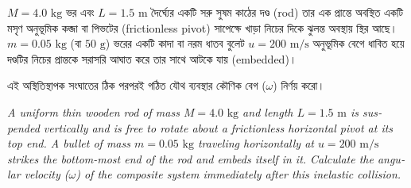 \documentclass[12pt, a4paper]{article}
\begin{document}
\begin{tcolorbox}[questionbox={প্রশ্ন (Question) 19}]
\noindent
$M = 4.0\text{ kg}$ ভর এবং $L = 1.5\text{ m}$ দৈর্ঘ্যের একটি সরু সুষম কাঠের দণ্ড (rod) তার এক প্রান্তে অবস্থিত একটি মসৃণ অনুভূমিক কব্জা বা পিভটের (frictionless pivot) সাপেক্ষে খাড়া নিচের দিকে ঝুলন্ত অবস্থায় স্থির আছে। $m = 0.05\text{ kg}$ (বা $50\text{ g}$) ভরের একটি কাদা বা নরম ধাতব বুলেট $u = 200\text{ m/s}$ অনুভূমিক বেগে ধাবিত হয়ে দণ্ডটির নিচের প্রান্তকে সরাসরি আঘাত করে তার সাথে আটকে যায় (embedded)। 

\vspace{0.3em}
\noindent
এই অস্থিতিস্থাপক সংঘাতের ঠিক পরপরই গঠিত যৌথ ব্যবস্থার কৌণিক বেগ ($\omega$) নির্ণয় করো।

\vspace{0.8em}
\begin{english}
\noindent\textit{\color{darkgray}
A uniform thin wooden rod of mass $M = 4.0\text{ kg}$ and length $L = 1.5\text{ m}$ is suspended vertically and is free to rotate about a frictionless horizontal pivot at its top end. A bullet of mass $m = 0.05\text{ kg}$ traveling horizontally at $u = 200\text{ m/s}$ strikes the bottom-most end of the rod and embeds itself in it. Calculate the angular velocity ($\omega$) of the composite system immediately after this inelastic collision.
}
\end{english}
\end{tcolorbox}
\end{document}
